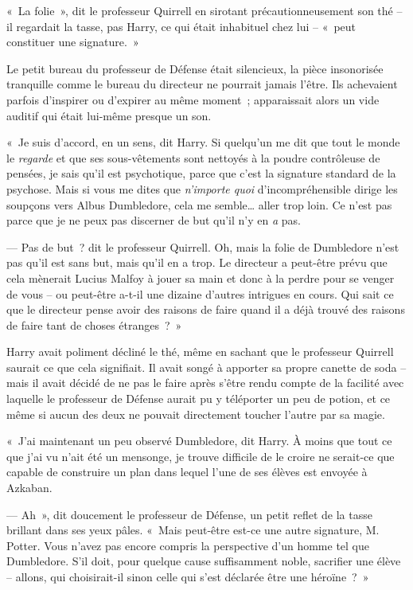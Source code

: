 «~La folie~», dit le professeur Quirrell en sirotant précautionneusement son thé -- il regardait la tasse, pas Harry, ce qui était inhabituel chez lui -- «~peut constituer une signature.~»

Le petit bureau du professeur de Défense était silencieux, la pièce insonorisée tranquille comme le bureau du directeur ne pourrait jamais l'être. Ils achevaient parfois d'inspirer ou d'expirer au même moment~; apparaissait alors un vide auditif qui était lui-même presque un son.

«~Je suis d'accord, en un sens, dit Harry. Si quelqu'un me dit que tout le monde le \emph{regarde} et que ses sous-vêtements sont nettoyés à la poudre contrôleuse de pensées, je sais qu'il est psychotique, parce que c'est la signature standard de la psychose. Mais si vous me dites que \emph{n'importe quoi} d'incompréhensible dirige les soupçons vers Albus Dumbledore, cela me semble… aller trop loin. Ce n'est pas parce que je ne peux pas discerner de but qu'il n'y en \emph{a} pas.

--- Pas de but~? dit le professeur Quirrell. Oh, mais la folie de Dumbledore n'est pas qu'il est sans but, mais qu'il en a trop. Le directeur a peut-être prévu que cela mènerait Lucius Malfoy à jouer sa main et donc à la perdre pour se venger de vous -- ou peut-être a-t-il une dizaine d'autres intrigues en cours. Qui sait ce que le directeur pense avoir des raisons de faire quand il a déjà trouvé des raisons de faire tant de choses étranges~?~»

Harry avait poliment décliné le thé, même en sachant que le professeur Quirrell saurait ce que cela signifiait. Il avait songé à apporter sa propre canette de soda -- mais il avait décidé de ne pas le faire après s'être rendu compte de la facilité avec laquelle le professeur de Défense aurait pu y téléporter un peu de potion, et ce même si aucun des deux ne pouvait directement toucher l'autre par sa magie.

«~J'ai maintenant un peu observé Dumbledore, dit Harry. À moins que tout ce que j'ai vu n'ait été un mensonge, je trouve difficile de le croire ne serait-ce que capable de construire un plan dans lequel l'une de ses élèves est envoyée à Azkaban.

--- Ah~», dit doucement le professeur de Défense, un petit reflet de la tasse brillant dans ses yeux pâles. «~Mais peut-être est-ce une autre signature, M. Potter. Vous n'avez pas encore compris la perspective d'un homme tel que Dumbledore. S'il doit, pour quelque cause suffisamment noble, sacrifier une élève -- allons, qui choisirait-il sinon celle qui s'est déclarée être une héroïne~?~»

